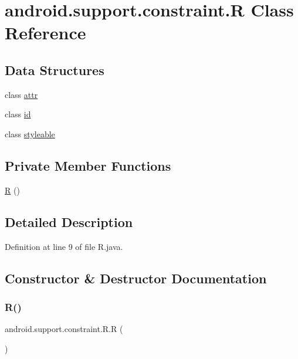 \hypertarget{classandroid_1_1support_1_1constraint_1_1_r}{}\section{android.\+support.\+constraint.\+R Class Reference}
\label{classandroid_1_1support_1_1constraint_1_1_r}
\subsection*{Data Structures}
\begin{DoxyCompactItemize}
\item 
class \mbox{\hyperlink{classandroid_1_1support_1_1constraint_1_1_r_1_1attr}{attr}}
\item 
class \mbox{\hyperlink{classandroid_1_1support_1_1constraint_1_1_r_1_1id}{id}}
\item 
class \mbox{\hyperlink{classandroid_1_1support_1_1constraint_1_1_r_1_1styleable}{styleable}}
\end{DoxyCompactItemize}
\subsection*{Private Member Functions}
\begin{DoxyCompactItemize}
\item 
\mbox{\hyperlink{classandroid_1_1support_1_1constraint_1_1_r_a3a5f7ff14dd944c2f20f0d8b2a38b81a}{R}} ()
\end{DoxyCompactItemize}


\subsection{Detailed Description}


Definition at line 9 of file R.\+java.



\subsection{Constructor \& Destructor Documentation}
\mbox{\label{classandroid_1_1support_1_1constraint_1_1_r_a3a5f7ff14dd944c2f20f0d8b2a38b81a}} 
\subsubsection{\texorpdfstring{R()}{R()}}
{\footnotesize\ttfamily android.\+support.\+constraint.\+R.\+R (\begin{DoxyParamCaption}{ }\end{DoxyParamCaption})\hspace{0.3cm}{\ttfamily [private]}}



